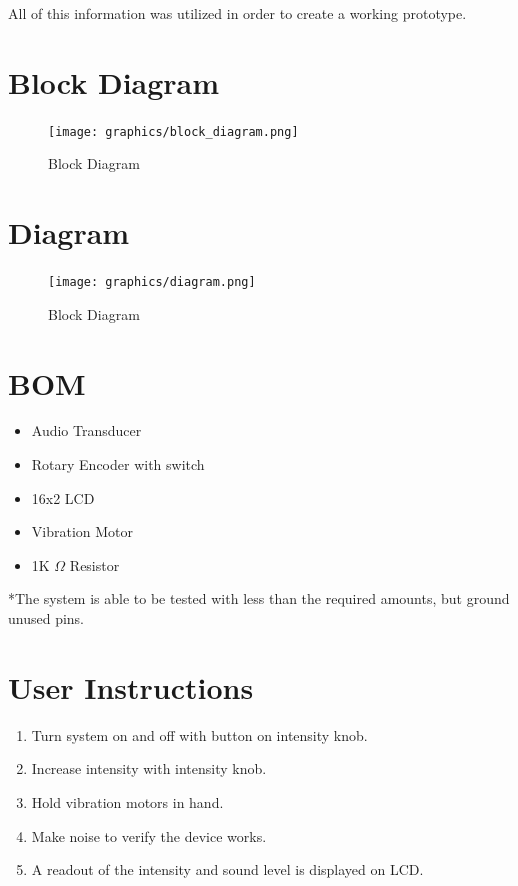 \documentclass{article}
\begin{document}
All of this information was utilized in order to create a working prototype.


\section{Block Diagram}
    \begin{figure}[h!]
    \begin{center}
        \texttt{[image: graphics/block\_diagram.png]}
    \end{center}
    \caption{Block Diagram}
    \label{fig:Block}
    \end{figure}
\newpage
\section{Diagram}
\begin{figure}[h!]
    \begin{center}
        \texttt{[image: graphics/diagram.png]}
    \end{center}
    \caption{Block Diagram}
    \label{fig:Block}
\end{figure}

\section{BOM}
    \begin{itemize}
        \item Audio Transducer              \tab [x5]
        \item Rotary Encoder with switch    \tab [x1]
        \item 16x2 LCD                      \tab [x1] 
        \item Vibration Motor               \tab [x2] 
        \item 1K $\Omega$ Resistor            \tab [x1]
    \end{itemize}
    *The system is able to be tested with less than the required amounts, but ground unused pins.

\section{User Instructions}
\begin{enumerate}
    \item Turn system on and off with button on intensity knob.
    \item Increase intensity with intensity knob.
    \item Hold vibration motors in hand.
    \item Make noise to verify the device works.
    \item A readout of the intensity and sound level is displayed on LCD.
\end{enumerate}
\end{document}
